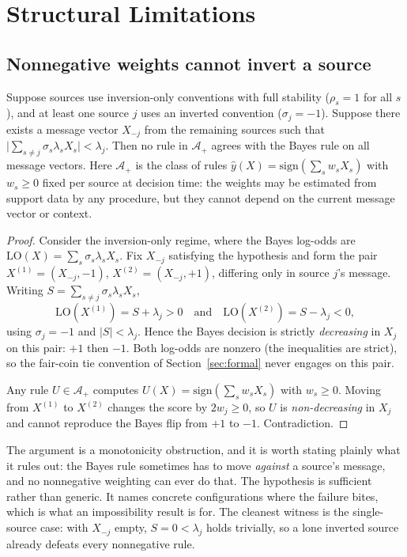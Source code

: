 \section{Structural Limitations}
\label{sec:theorems}

\subsection{Nonnegative weights cannot invert a source}

\begin{theorem}
\label{thm:nonneg}
Suppose sources use inversion-only conventions with full stability
($\rho_s = 1$ for all $s$), and at least one source $j$ uses an inverted
convention ($\sigma_j = -1$). Suppose there exists a message vector
$X_{-j}$ from the remaining sources such that
$\bigl|\sum_{s \neq j} \sigma_s \lambda_s X_s\bigr| < \lambda_j$.
Then no rule in $\mathcal{A}_+$ agrees with the Bayes rule on all message
vectors. Here $\mathcal{A}_+$ is the class of rules
$\hat{y}(X) = \mathrm{sign}(\sum_s w_s X_s)$ with $w_s \geq 0$ fixed per
source at decision time: the weights may be estimated from support data
by any procedure, but they cannot depend on the current message vector
or context.
\end{theorem}

\begin{proof}
Consider the inversion-only regime, where the Bayes log-odds are
$\mathrm{LO}(X) = \sum_s \sigma_s \lambda_s X_s$.
Fix $X_{-j}$ satisfying the hypothesis and form the pair
$X^{(1)} = (X_{-j}, -1)$, $X^{(2)} = (X_{-j}, +1)$, differing only in
source $j$'s message. Writing $S = \sum_{s\neq j}\sigma_s\lambda_s X_s$,
\[
\mathrm{LO}(X^{(1)}) = S + \lambda_j > 0
\quad\text{and}\quad
\mathrm{LO}(X^{(2)}) = S - \lambda_j < 0,
\]
using $\sigma_j = -1$ and $|S| < \lambda_j$. Hence the Bayes decision is
strictly \emph{decreasing} in $X_j$ on this pair: $+1$ then $-1$.
Both log-odds are nonzero (the inequalities are strict), so the
fair-coin tie convention of Section~\ref{sec:formal} never engages on
this pair.

Any rule $U \in \mathcal{A}_+$ computes
$U(X) = \mathrm{sign}(\sum_s w_s X_s)$ with $w_s \geq 0$. Moving from
$X^{(1)}$ to $X^{(2)}$ changes the score by $2w_j \geq 0$, so $U$ is
\emph{non-decreasing} in $X_j$ and cannot reproduce the Bayes flip from
$+1$ to $-1$. Contradiction.
\end{proof}

The argument is a monotonicity obstruction, and it is worth stating
plainly what it rules out: the Bayes rule sometimes has to move
\emph{against} a source's message, and no nonnegative weighting can ever do
that. The hypothesis is sufficient rather than generic. It names concrete
configurations where the failure bites, which is what an impossibility
result is for. The cleanest witness is the single-source case: with
$X_{-j}$ empty, $S = 0 < \lambda_j$ holds trivially, so a lone inverted
source already defeats every nonnegative rule.

